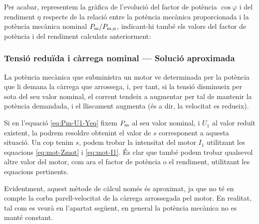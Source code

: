 \begin{exemple}
	Per acabar, representem  la gràfica de l'evolució del factor de potència $\cos\varphi$ i del rendiment $\eta$  respecte de la relació entre la potència mecànica proporcionada i la potència mecànica nominal $P_\mathrm{m}/P_\mathrm{m,n}$, indicant-hi també els valors del factor de potència i del rendiment calculats anteriorment:
	\begin{center}
		
	\end{center}

\end{exemple}
	
\subsubsection{Tensió reduïda i càrrega nominal --- Solució aproximada}

La potència mecànica que subministra un motor ve determinada per la potència que li demana la càrrega que arrossega, i, per tant, si la tensió disminueix per sota del seu valor nominal, el corrent tendeix a augmentar per tal de mantenir la potència demandada, i el lliscament augmenta (és a dir, la velocitat es redueix).

Si en l'equació \eqref{eq:Pm-U1-Yeq} fixem $P_\mathrm{m}$ al seu valor nominal, i $U_1$ al valor reduït existent, la podrem resoldre obtenint el valor de $s$ corresponent  a aquesta situació. Un cop tenim $s$, podem trobar la intensitat del motor $I_1$ utilitzant les equacions \eqref{eq:mot-Zmot} i \eqref{eq:mot-I1}. És clar que també podem trobar qualsevol altre valor del motor, com  ara el factor de potència o el rendiment, utilitzant les equacions pertinents.

Evidentment, aquest mètode de càlcul només és aproximat, ja que no té en compte la corba parell-velocitat de la càrrega arrossegada pel motor. En realitat, tal com es veurà en l'apartat següent, en general la potència mecànica no es manté constant.

